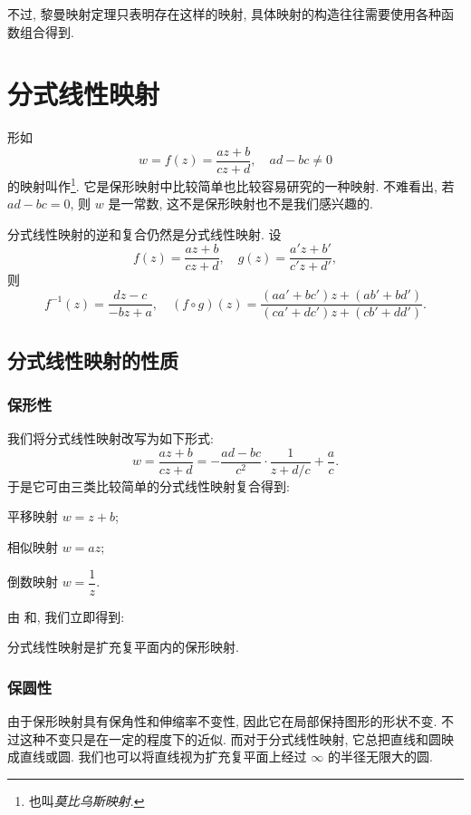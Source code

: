 不过, 黎曼映射定理只表明存在这样的映射, 具体映射的构造往往需要使用各种函数组合得到.



\section{分式线性映射}

形如
\[
  w=f(z)=\dfrac{az+b}{cz+d},\quad ad-bc\neq 0
\]
的映射叫作\footnote{也叫\emph{莫比乌斯映射}.}.
它是保形映射中比较简单也比较容易研究的一种映射.
不难看出, 若 $ad-bc=0$, 则 $w$ 是一常数, 这不是保形映射也不是我们感兴趣的.

分式线性映射的逆和复合仍然是分式线性映射.
设
\[
  f(z)=\frac{az+b}{cz+d},\quad
  g(z)=\frac{a'z+b'}{c'z+d'},
\]
则
\[
  f^{-1}(z)=\frac{dz-c}{-bz+a},\quad
  (f\circ g)(z)=\frac{(aa'+bc')z+(ab'+bd')}{(ca'+dc')z+(cb'+dd')}.
\]

\subsection{分式线性映射的性质}

\subsubsection{保形性}

我们将分式线性映射改写为如下形式:
\[
   w
  =\frac{az+b}{cz+d}
  =-\frac{ad-bc}{c^2}\cdot\frac1{z+d/c}+\frac ac.
\]
于是它可由三类比较简单的分式线性映射复合得到:
\begin{enuma}
  \item 平移映射 $w=z+b$;
  \item 相似映射 $w=az$;\smallskip
  \item 倒数映射 $w=\dfrac1z$.
\end{enuma}
\smallskip
由 和, 我们立即得到:

\begin{theorem}
  分式线性映射是扩充复平面内的保形映射.
\end{theorem}


\subsubsection{保圆性}

由于保形映射具有保角性和伸缩率不变性, 因此它在局部保持图形的形状不变.
不过这种不变只是在一定的程度下的近似.
而对于分式线性映射, 它总把直线和圆映成直线或圆.
我们也可以将直线视为扩充复平面上经过 $\infty$ 的半径无限大的圆.

